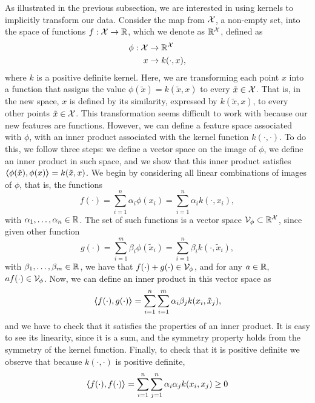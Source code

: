 As illustrated in the previous subsection, we are interested in using kernels to implicitly transform our data. Consider the map from $\mathcal{X}$, a non-empty set, into the space of functions $f: \mathcal{X} \to \mathbb{R}$, which we denote as $\mathbb{R}^{\mathcal{X}}$, defined as 
    \begin{equation}
        \begin{aligned}
            \nonumber
            \phi: \mathcal{X} &\to \mathbb{R}^{\mathcal{X}} \\
            x &\to k(\cdot, x) ,
        \end{aligned}
    \end{equation}
where $k$ is a positive definite kernel. Here, we are transforming each point $x$ into a function that assigns the value $\phi(\tilde{x}) = k(\tilde{x}, x)$ to every $\tilde{x} \in \mathcal{X}$. That is, in the new space, $x$ is defined by its similarity, expressed by $k(\tilde{x}, x)$, to every other points $\tilde{x} \in \mathcal{X}$. This transformation seems difficult to work with because our new features are functions.
However, we can define a feature space associated with $\phi$, with an inner product associated with the kernel function $k(\cdot, \cdot)$. To do this, we follow three steps: we define a vector space on the image of $\phi$, we define an inner product in such space, and we show that this inner product satisfies $\bm{\left\langle} \phi(\tilde{x}), \phi(x) \bm{\right\rangle} = k(\tilde{x}, x)$.
We begin by considering all linear combinations of images of $\phi$, that is, the functions 
$$ f(\cdot) = \sum_{i=1}^n \alpha_i \phi(x_i) =\sum_{i=1}^n \alpha_i k(\cdot, x_i), $$
with $\alpha_1, \ldots, \alpha_n \in \mathbb{R}$.
The set of such functions is a vector space $\mathcal{V}_\phi \subset \mathbb{R}^{\mathcal{X}}$, since given other function 
$$ g(\cdot) = \sum_{i=1}^m \beta_i \phi(\tilde{x}_i) =\sum_{i=1}^n \beta_i k(\cdot, \tilde{x}_i) ,$$
with $\beta_1, \ldots, \beta_m \in \mathbb{R}$,
we have that $f(\cdot) + g(\cdot) \in \mathcal{V}_\phi$, and for any $a \in \mathbb{R}$,  $a f(\cdot) \in \mathcal{V}_\phi$.
Now, we can define an inner product in this vector space as 
$$ \bm{\left\langle} f(\cdot), g(\cdot) \bm{\right\rangle} = \sum_{i=1}^n \sum_{i=1}^m \alpha_i \beta_j k(x_i, \tilde{x}_j),$$
and we have to check that it satisfies the properties of an inner product. It is easy to see its linearity, since it is a sum, and the symmetry property holds from the symmetry of the kernel function. Finally, to check that it is positive definite we observe that because $k(\cdot, \cdot)$ is positive definite,
$$ \bm{\left\langle} f(\cdot), f(\cdot) \bm{\right\rangle} = \sum_{i=1}^n \sum_{j=1}^n \alpha_i \alpha_j k(x_i, x_j) \geq 0$$

